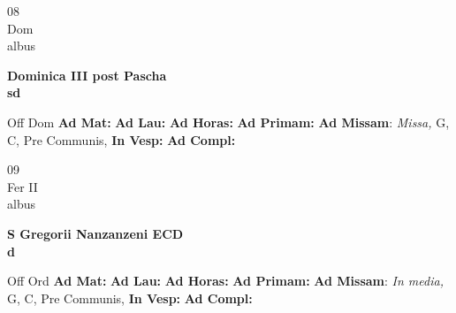 \documentclass[10pt, openany]{book}
\begin{document}
    \begin{center}
        \begin{minipage}{3.5in}
            \vspace{2em}
            \begin{minipage}{0.5in}
                {\Huge 08} \\
                {\normalsize Dom} \\
                {\normalsize albus}
            \end{minipage}
            \begin{minipage}{3.0in}
                \textbf{ \large Dominica III post Pascha \\
                \textnormal{\normalsize sd}} \\ 
            \end{minipage}
            \begin{justify}Off Dom
                \textbf{Ad Mat: }
                \textbf{Ad Lau: }
                \textbf{Ad Horas: }
                \textbf{Ad Primam: }\textbf{Ad Missam}: \textit{Missa,} G, C, Pre Communis,  
                \textbf{In Vesp: }
                \textbf{Ad Compl: }
            \end{justify}
        \end{minipage}
    \end{center}

    \begin{center}
        \begin{minipage}{3.5in}
            \vspace{2em}
            \begin{minipage}{0.5in}
                {\Huge 09} \\
                {\normalsize Fer II} \\
                {\normalsize albus}
            \end{minipage}
            \begin{minipage}{3.0in}
                \textbf{ \large S Gregorii Nanzanzeni ECD \\
                \textnormal{\normalsize d}} \\ 
            \end{minipage}
            \begin{justify}Off Ord
                \textbf{Ad Mat: }
                \textbf{Ad Lau: }
                \textbf{Ad Horas: }
                \textbf{Ad Primam: }\textbf{Ad Missam}: \textit{In media,} G, C, Pre Communis,  
                \textbf{In Vesp: }
                \textbf{Ad Compl: }
            \end{justify}
        \end{minipage}
    \end{center}
\end{document}
